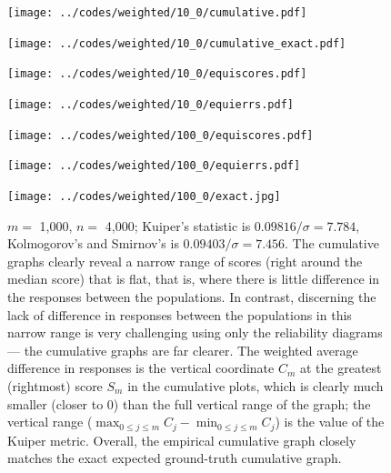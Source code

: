 \documentclass[]{fairmeta}
\begin{document}
\begin{figure}
\begin{centering}

\parbox{\imsize}{\texttt{[image: ../codes/weighted/10\_0/cumulative.pdf]}}
\quad\quad
\parbox{\imsize}{\texttt{[image: ../codes/weighted/10\_0/cumulative\_exact.pdf]}}

\vspace{\vertsep}

\parbox{\imsize}{\texttt{[image: ../codes/weighted/10\_0/equiscores.pdf]}}
\quad\quad
\parbox{\imsize}{\texttt{[image: ../codes/weighted/10\_0/equierrs.pdf]}}

\vspace{\vertsep}

\parbox{\imsize}{\texttt{[image: ../codes/weighted/100\_0/equiscores.pdf]}}
\quad\quad
\parbox{\imsize}{\texttt{[image: ../codes/weighted/100\_0/equierrs.pdf]}}

\vspace{\vertsep}

\parbox{\imsize}{\texttt{[image: ../codes/weighted/100\_0/exact.jpg]}}

\end{centering}
\caption{$m =$ 1,000, $n =$ 4,000;
         Kuiper's statistic is $0.09816 / \sigma = 7.784$,
         Kolmogorov's and Smirnov's is $0.09403 / \sigma = 7.456$.
         The cumulative graphs clearly reveal a narrow range of scores
         (right around the median score) that is flat, that is, where there is
         little difference in the responses between the populations.
         In contrast, discerning the lack of difference in responses
         between the populations in this narrow range is very challenging 
         using only the reliability diagrams --- the cumulative graphs
         are far clearer. The weighted average difference in responses
         is the vertical coordinate $C_m$ at the greatest (rightmost) score
         $S_m$ in the cumulative plots, which is clearly much smaller
         (closer to 0) than the full vertical range of the graph;
         the vertical range
         ($\max_{0 \le j \le m} C_j - \min_{0 \le j \le m} C_j$) is the value
         of the Kuiper metric. Overall, the empirical cumulative graph
         closely matches the exact expected ground-truth cumulative graph.
}
\label{ex0}
\end{figure}
\end{document}
